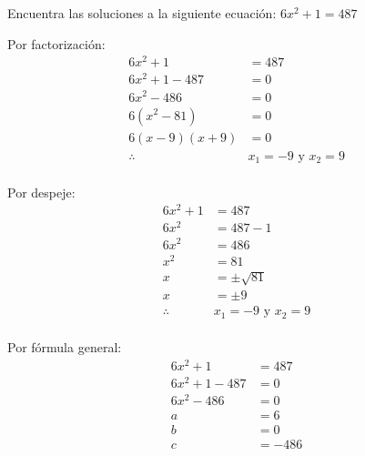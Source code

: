 Encuentra las soluciones a la siguiente ecuación:
$6x^2+1=487$

\begin{solutionbox}{13cm}
    \begin{multicols}{2}
        Por factorización:
        \begin{align*}
            6x^2+1      & = 487                     \\
            6x^2+1-487  & =0                        \\
            6x^2-486    & = 0                       \\
            6(x^2-81)   & = 0                       \\
            6(x-9)(x+9) & = 0                       \\
            \therefore  & x_1 =-9 \text{ y } x_2 =9
        \end{align*}
        \\
        Por despeje:
        \begin{align*}
            6x^2+1     & = 487                     \\
            6x^2       & = 487-1                   \\
            6x^2       & = 486                     \\
            x^2        & = 81                      \\
            x          & = \pm\sqrt{81}            \\
            x          & = \pm 9                   \\
            \therefore & x_1 =-9 \text{ y } x_2 =9
        \end{align*}
        \\
        Por fórmula general:
        \begin{align*}
            6x^2+1     & = 487                                                       \\
            6x^2+1-487 & = 0                                                         \\
            6x^2-486   & = 0                                                         \\
            a          & =6                                                          \\
            b          & =0                                                          \\
            c          & =-486                                                       \\

\end{align*}
\end{multicols}
\end{solutionbox}

